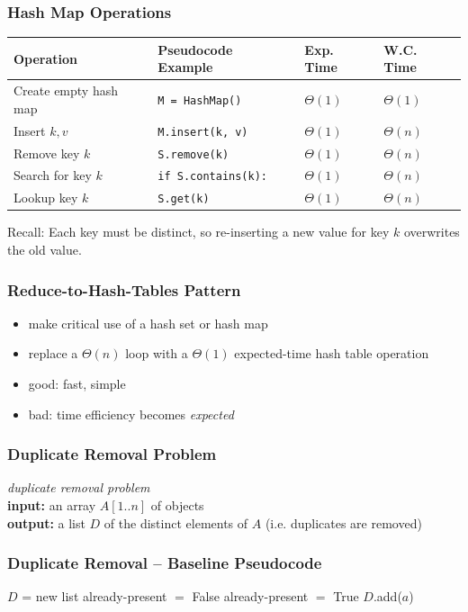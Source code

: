 \documentclass[10pt]{beamer}
\begin{document}
\begin{frame} \frametitle{Hash Map Operations}
  \begin{center}
    \begin{tabular}{llll}
      \textbf{Operation} & \textbf{Pseudocode Example} & \textbf{Exp. Time} & \textbf{W.C. Time} \\ \hline
      Create empty hash map & \texttt{M = HashMap()} & $\Theta(1)$ & $\Theta(1)$ \\
      Insert $k, v$ & \texttt{M.insert(k, v)} & $\Theta(1)$ & $\Theta(n)$ \\
      Remove key $k$ & \texttt{S.remove(k)} & $\Theta(1)$ & $\Theta(n)$ \\
      Search for key $k$ & \texttt{if S.contains(k):} & $\Theta(1)$ & $\Theta(n)$ \\
      Lookup key $k$ & \texttt{S.get(k)} & $\Theta(1)$ & $\Theta(n)$ \\
    \end{tabular}
  \end{center}

  \vspace{12pt}
  Recall: Each key must be distinct, so re-inserting a new value for key $k$ overwrites the old value.
\end{frame}

\begin{frame} \frametitle{Reduce-to-Hash-Tables Pattern}
\begin{itemize}
  \item make critical use of a hash set or hash map
  \item replace a $\Theta(n)$ loop with a $\Theta(1)$ expected-time hash table operation
  \item good: fast, simple
  \item bad: time efficiency becomes \emph{expected}
\end{itemize}
\end{frame}

\begin{frame} \frametitle{Duplicate Removal Problem}
  \emph{duplicate removal problem} \\
  \textbf{input:} an array $A[1..n]$ of objects\\
  \textbf{output:} a list $D$ of the distinct elements of $A$ (i.e. duplicates
    are removed)\\

\end{frame}

\begin{frame} \frametitle{Duplicate Removal -- Baseline Pseudocode}
  {\footnotesize
  \begin{algorithmic}[1]
    \State $D$ = new list
        \State already-present $ = $ False
            \State already-present $ = $ True
          \EndIf
        \EndFor
          \State $D$.add($a$)
        \EndIf
    \EndFor
    \State {}
    \EndFunction
  \end{algorithmic}
  }
\end{frame}
\end{document}

